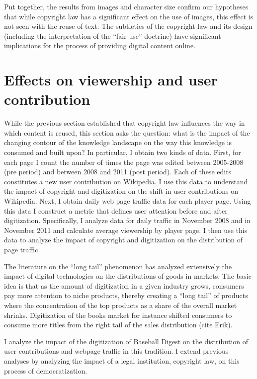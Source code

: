 \documentclass[12pt]{article}
\begin{document}
\label{tab:char_regression}


Put together, the results from images and character size confirm our hypotheses that while copyright law has a significant effect on the use of images, this effect is not seen with the reuse of text. The subtleties of the copyright law and its design (including the interpretation of the ``fair use'' doctrine) have significant implications for the process of providing digital content online. 

\section{Effects on viewership and user contribution}

While the previous section established that copyright law influences the way in which content is reused, this section asks the question: what is the impact of the changing contour of the knowledge landscape on the way this knowledge is consumed and built upon? In particular, I obtain two kinds of data. First, for each page I count the number of times the page was edited between 2005-2008 (pre period) and between 2008 and 2011 (post period). Each of these edits constitutes a new user contribution on Wikipedia. I use this data to understand the impact of copyright and digitization on the shift in user contributions on Wikipedia. Next, I obtain daily web page traffic data for each player page. Using this data I construct a metric that defines user attention before and after digitization. Specifically, I analyze data for daily traffic in November 2008 and in November 2011 and calculate average viewership by player page. I then use this data to analyze the impact of copyright and digitization on the distribution of page traffic. 

The literature on the ``long tail'' phenomenon has analyzed extensively the impact of digital technologies on the distributions of goods in markets. The basic idea is that as the amount of digitization in a given industry grows, consumers pay more attention to niche products, thereby creating a ``long tail'' of products where the concentration of the top products as a share of the overall market shrinks. Digitization of the books market for instance shifted consumers to consume more titles from the right tail of the sales distribution (cite Erik). 

I analyze the impact of the digitization of Baseball Digest on the distribution of user contributions and webpage traffic in this tradition. I extend previous analyses by analyzing the impact of a legal institution, copyright law, on this process of democratization.
\end{document}
